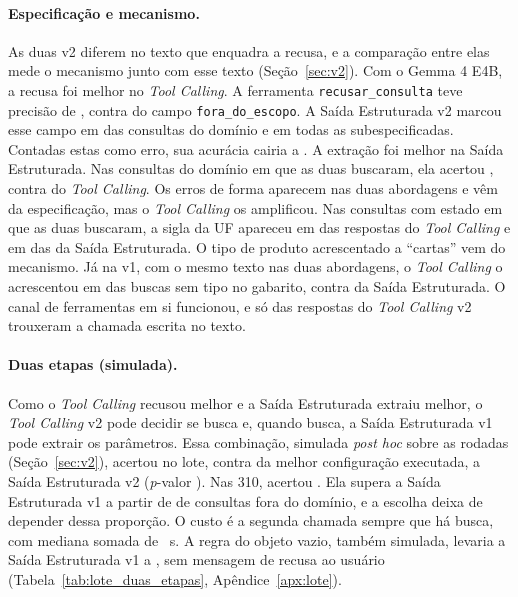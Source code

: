 \paragraph{Especificação e mecanismo.} As duas v2 diferem no texto que enquadra a recusa, e a comparação entre elas mede o mecanismo junto com esse texto (Seção~\ref{sec:v2}). Com o Gemma 4 E4B, a recusa foi melhor no \textit{Tool Calling}. A ferramenta \texttt{recusar\_consulta} teve precisão de , contra  do campo \texttt{fora\_do\_escopo}. A Saída Estruturada v2 marcou esse campo em  das consultas do domínio e em todas as subespecificadas. Contadas estas como erro, sua acurácia cairia a . A extração foi melhor na Saída Estruturada. Nas consultas do domínio em que as duas buscaram, ela acertou , contra  do \textit{Tool Calling}. Os erros de forma aparecem nas duas abordagens e vêm da especificação, mas o \textit{Tool Calling} os amplificou. Nas consultas com estado em que as duas buscaram, a sigla da UF apareceu em  das respostas do \textit{Tool Calling} e em  das da Saída Estruturada. O tipo de produto acrescentado a ``cartas'' vem do mecanismo. Já na v1, com o mesmo texto nas duas abordagens, o \textit{Tool Calling} o acrescentou em  das buscas sem tipo no gabarito, contra  da Saída Estruturada. O canal de ferramentas em si funcionou, e só  das  respostas do \textit{Tool Calling} v2 trouxeram a chamada escrita no texto.

\paragraph{Duas etapas (simulada).} Como o \textit{Tool Calling} recusou melhor e a Saída Estruturada extraiu melhor, o \textit{Tool Calling} v2 pode decidir se busca e, quando busca, a Saída Estruturada v1 pode extrair os parâmetros. Essa combinação, simulada \textit{post hoc} sobre as rodadas (Seção~\ref{sec:v2}), acertou  no lote, contra  da melhor configuração executada, a Saída Estruturada v2 (\textit{p}-valor ). Nas 310, acertou . Ela supera a Saída Estruturada v1 a partir de  de consultas fora do domínio, e a escolha deixa de depender dessa proporção. O custo é a segunda chamada sempre que há busca, com mediana somada de ~s. A regra do objeto vazio, também simulada, levaria a Saída Estruturada v1 a , sem mensagem de recusa ao usuário (Tabela~\ref{tab:lote_duas_etapas}, Apêndice~\ref{apx:lote}).


